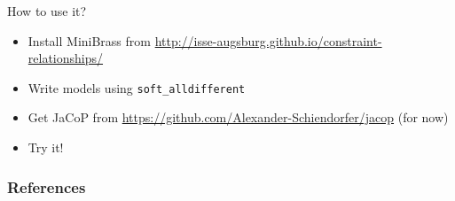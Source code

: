 \documentclass[10pt,xcolor={dvipsnames},fleqn]{beamer}
\begin{document}
\begin{frame}{How to use it?}
\begin{itemize}
\item Install MiniBrass from \url{http://isse-augsburg.github.io/constraint-relationships/}
\item Write models using \texttt{soft\_alldifferent}
\item Get JaCoP from \url{https://github.com/Alexander-Schiendorfer/jacop} (for now)
\item Try it!
\end{itemize}
\end{frame}

\begin{frame}[allowframebreaks]
        \frametitle{References}
        
        
\end{frame}
\end{document}
